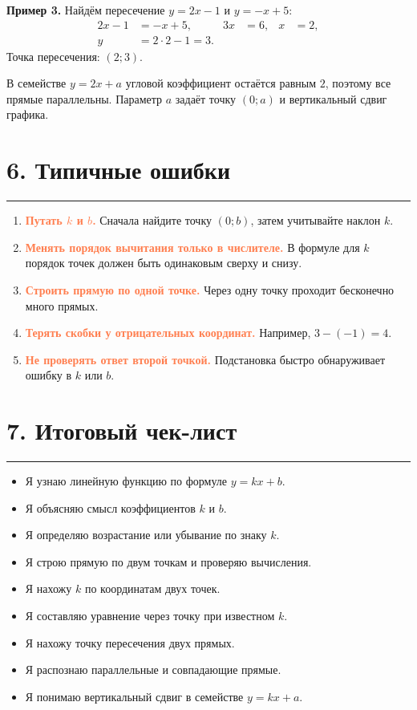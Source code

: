 \documentclass[a4paper,12pt]{article}
\newcommand{\sectionline}{\par\vspace{2pt}\textcolor{accent}{\rule{\linewidth}{0.8pt}}\vspace{5pt}}
\newcommand{\key}[1]{\textcolor{darkaccent}{\textbf{#1}}}
\newcommand{\warn}[1]{\textcolor{coral}{\textbf{#1}}}
\begin{document}
\key{Пример 3.} Найдём пересечение $y=2x-1$ и $y=-x+5$:
\[
  \begin{aligned}
    2x-1&=-x+5, & 3x&=6, & x&=2,\\
    y&=2\cdot2-1=3.
  \end{aligned}
\]
Точка пересечения: $(2;3)$.

В семействе $y=2x+a$ угловой коэффициент остаётся равным $2$, поэтому все
прямые параллельны. Параметр $a$ задаёт точку $(0;a)$ и вертикальный сдвиг
графика.

\section*{6. Типичные ошибки}
\sectionline

\begin{enumerate}
  \item \warn{Путать $k$ и $b$.} Сначала найдите точку $(0;b)$, затем учитывайте наклон $k$.
  \item \warn{Менять порядок вычитания только в числителе.} В формуле для $k$ порядок точек должен быть одинаковым сверху и снизу.
  \item \warn{Строить прямую по одной точке.} Через одну точку проходит бесконечно много прямых.
  \item \warn{Терять скобки у отрицательных координат.} Например, $3-(-1)=4$.
  \item \warn{Не проверять ответ второй точкой.} Подстановка быстро обнаруживает ошибку в $k$ или $b$.
\end{enumerate}

\section*{7. Итоговый чек-лист}
\sectionline

\begingroup
{}
\begin{itemize}[label=$\square$,itemsep=2pt]
  \item Я узнаю линейную функцию по формуле $y=kx+b$.
  \item Я объясняю смысл коэффициентов $k$ и $b$.
  \item Я определяю возрастание или убывание по знаку $k$.
  \item Я строю прямую по двум точкам и проверяю вычисления.
  \item Я нахожу $k$ по координатам двух точек.
  \item Я составляю уравнение через точку при известном $k$.
  \item Я нахожу точку пересечения двух прямых.
  \item Я распознаю параллельные и совпадающие прямые.
  \item Я понимаю вертикальный сдвиг в семействе $y=kx+a$.
\end{itemize}
\endgroup
\end{document}
